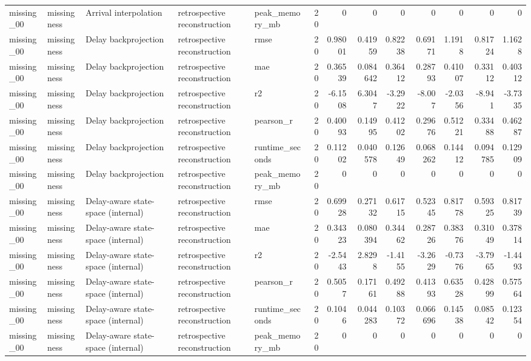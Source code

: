 \begin{table}[!htbp]
{{\begin{tabular}{lllllrrrrrrrr}
missing_00 & missingness & Arrival interpolation & retrospective reconstruction & peak_memory_mb & 20 & 0 & 0 & 0 & 0 & 0 & 0 & 0 \\
missing_00 & missingness & Delay backprojection & retrospective reconstruction & rmse & 20 & 0.98001 & 0.41959 & 0.82238 & 0.69171 & 1.1918 & 0.81724 & 1.1628 \\
missing_00 & missingness & Delay backprojection & retrospective reconstruction & mae & 20 & 0.36539 & 0.084642 & 0.36412 & 0.28793 & 0.41007 & 0.33112 & 0.40312 \\
missing_00 & missingness & Delay backprojection & retrospective reconstruction & r2 & 20 & -6.1508 & 6.3047 & -3.2922 & -8.007 & -2.0356 & -8.941 & -3.7335 \\
missing_00 & missingness & Delay backprojection & retrospective reconstruction & pearson_r & 20 & 0.40093 & 0.14995 & 0.41202 & 0.29676 & 0.51221 & 0.33488 & 0.46287 \\
missing_00 & missingness & Delay backprojection & retrospective reconstruction & runtime_seconds & 20 & 0.11202 & 0.040578 & 0.12649 & 0.068262 & 0.14412 & 0.094785 & 0.12909 \\
missing_00 & missingness & Delay backprojection & retrospective reconstruction & peak_memory_mb & 20 & 0 & 0 & 0 & 0 & 0 & 0 & 0 \\
missing_00 & missingness & Delay-aware state-space (internal) & retrospective reconstruction & rmse & 20 & 0.69928 & 0.27132 & 0.61715 & 0.52345 & 0.81778 & 0.59325 & 0.81739 \\
missing_00 & missingness & Delay-aware state-space (internal) & retrospective reconstruction & mae & 20 & 0.34323 & 0.080394 & 0.34462 & 0.28726 & 0.38376 & 0.31049 & 0.37814 \\
missing_00 & missingness & Delay-aware state-space (internal) & retrospective reconstruction & r2 & 20 & -2.5443 & 2.8298 & -1.4155 & -3.2629 & -0.7376 & -3.7965 & -1.4493 \\
missing_00 & missingness & Delay-aware state-space (internal) & retrospective reconstruction & pearson_r & 20 & 0.5057 & 0.17161 & 0.49288 & 0.41393 & 0.63528 & 0.42899 & 0.57564 \\
missing_00 & missingness & Delay-aware state-space (internal) & retrospective reconstruction & runtime_seconds & 20 & 0.1046 & 0.044283 & 0.10372 & 0.066696 & 0.14538 & 0.08542 & 0.12354 \\
missing_00 & missingness & Delay-aware state-space (internal) & retrospective reconstruction & peak_memory_mb & 20 & 0 & 0 & 0 & 0 & 0 & 0 & 0 \\

\end{tabular}}}
\end{table}
